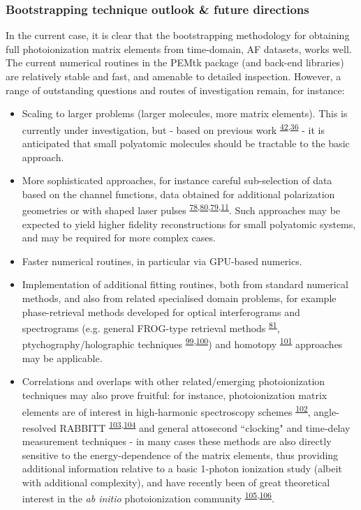 \documentclass[10pt]{article}
\begin{document}
\subsubsection{Bootstrapping technique outlook \& future directions}

In the current case, it is clear that the bootstrapping methodology for obtaining full photoionization matrix elements from time-domain, AF datasets, works well. The current numerical routines in the PEMtk package (and back-end libraries) are relatively stable and fast, and amenable to detailed inspection. However, a range of outstanding questions and routes of investigation remain, for instance:

\begin{itemize}
\item Scaling to larger problems (larger molecules, more matrix elements). This is currently under investigation, but - based on previous work \textsuperscript{\hyperref[csl:42]{42},\hyperref[csl:36]{36}} - it is anticipated that small polyatomic molecules should be tractable to the basic approach. 
\item More sophisticated approaches, for instance careful sub-selection of data based on the channel functions, data obtained for additional polarization geometries or with shaped laser pulses \textsuperscript{\hyperref[csl:78]{78},\hyperref[csl:80]{80},\hyperref[csl:79]{79},\hyperref[csl:11]{11}}. Such approaches may be expected to yield higher fidelity reconstructions for small polyatomic systems, and may be required for more complex cases.
\item Faster numerical routines, in particular via GPU-based numerics.
\item Implementation of additional fitting routines, both from standard numerical methods, and also from related specialised domain problems, for example phase-retrieval methods developed for optical interferograms and spectrograms (e.g. general FROG-type retrieval methods \textsuperscript{\hyperref[csl:81]{81}}, ptychography/holographic techniques \textsuperscript{\hyperref[csl:99]{99},\hyperref[csl:100]{100}}) and homotopy \textsuperscript{\hyperref[csl:101]{101}} approaches may be applicable.
\item Correlations and overlaps with other related/emerging photoionization techniques may also prove fruitful: for instance, photoionization matrix elements are of interest in high-harmonic spectroscopy schemes \textsuperscript{\hyperref[csl:102]{102}}, angle-resolved RABBITT \textsuperscript{\hyperref[csl:103]{103},\hyperref[csl:104]{104}} and general attosecond ``clocking" and time-delay measurement techniques - in many cases these methods are also directly sensitive to the energy-dependence of the matrix elements, thus providing additional information relative to a basic 1-photon ionization study (albeit with additional complexity), and have recently been of great theoretical interest in the \textit{ab initio} photoionization community \textsuperscript{\hyperref[csl:105]{105},\hyperref[csl:106]{106}}.

\end{itemize}
\end{document}
